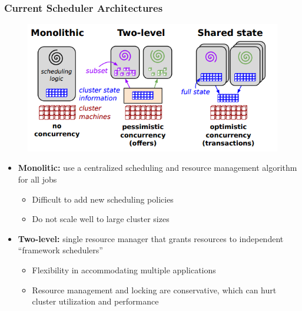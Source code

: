 \begin{frame}\frametitle{Current Scheduler Architectures}
\begin{figure}[h]
  \centering
  \includegraphics[scale=0.3]{./figures/intro_arch}
  \label{fig:intro_arch}
\end{figure}
\begin{itemize}
	\item {\bf Monolitic:} use a centralized scheduling and resource management algorithm for all jobs
	\begin{itemize}
		\item Difficult to add new scheduling policies
		\item Do not scale well to large cluster sizes
	\end{itemize}
	
\vspace{10pt}

	\item {\bf Two-level:} single resource manager that grants resources to independent ``framework schedulers''
	\begin{itemize}
		\item Flexibility in accommodating multiple applications
		\item Resource management and locking are conservative, which can hurt cluster utilization and performance
	\end{itemize}
\end{itemize}
\end{frame}

